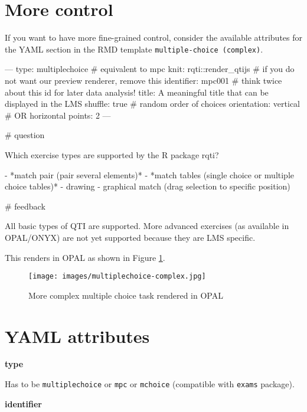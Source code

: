 \documentclass[twoside]{tufte-book}
\newenvironment{Shaded}{}{}
\begin{document}
\section{More control}\label{more-control-1}

If you want to have more fine-grained control, consider the available attributes for the YAML section in the RMD template \texttt{multiple-choice\ (complex)}.

\begin{Shaded}
\begin{Highlighting}
---
type: multiplechoice # equivalent to mpc
knit: rqti::render_qtijs # if you do not want our preview renderer, remove this
identifier: mpc001 # think twice about this id for later data analysis!
title: A meaningful title that can be displayed in the LMS
shuffle: true # random order of choices
orientation: vertical # OR horizontal
points: 2
---

# question

Which exercise types are supported by the R package rqti?

- *match pair (pair several elements)*
- *match tables (single choice or multiple choice tables)*
- drawing
- graphical match (drag selection to specific position)

# feedback

All basic types of QTI are supported. More advanced exercises (as available in
OPAL/ONYX) are not yet supported because they are LMS specific.
\end{Highlighting}
\end{Shaded}

\newpage
This renders in OPAL as shown in Figure \ref{mpc2opal}.

\begin{figure}
\centering
\texttt{[image: images/multiplechoice-complex.jpg]}
\caption{\label{mpc2opal}More complex multiple choice task rendered in OPAL}
\end{figure}

\section{YAML attributes}\label{YAML-attributes-1}

\noindent\textbf{type}\label{type-1}

Has to be \texttt{multiplechoice} or \texttt{mpc} or \texttt{mchoice} (compatible with \texttt{exams} package).

\noindent\textbf{identifier}\label{identifier-1}
\end{document}
